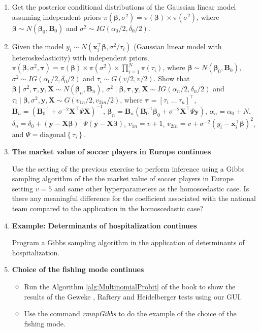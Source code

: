 \begin{enumerate}
	\item Get the posterior conditional distributions of the Gaussian linear model assuming independent priors $\pi(\bm{\beta},\sigma^2)=\pi(\bm{\beta})\times\pi(\sigma^2)$, where $\bm{\beta} \sim N(\bm{\beta}_0, {\bm{B}}_0)$ and $\sigma^2 \sim IG(\alpha_0/2, \delta_0/2)$.
	
	\item Given the model $y_i\sim N({\bm{x}}_i^{\top}\bm{\beta}, \sigma^2/\tau_i)$ (Gaussian linear model with heteroskedasticity) with independent priors,  $\pi(\bm{\beta},\sigma^2,\bm{\tau})=\pi(\bm{\beta})\times\pi(\sigma^2)\times\prod_{i=1}^N\pi(\tau_i)$, where $\bm{\beta} \sim N(\bm{\beta}_0, {\bm{B}}_0)$, $\sigma^2 \sim IG(\alpha_0/2, \delta_0/2)$ and $\tau_i\sim G(v/2,v/2)$. Show that $\bm{\beta}\mid \sigma^2,\bm{\tau},{\bm{y}},{\bm{X}}\sim N(\bm{\beta}_n,{\bm{B}}_n)$, $\sigma^2\mid \bm{\beta},\bm{\tau},{\bm{y}},{\bm{X}}\sim IG(\alpha_n/2,\delta_n/2)$ and $\tau_i\mid \bm{\beta},\sigma^2,{\bm{y}},{\bm{X}}\sim G(v_{1n}/2,v_{2in}/2)$, where $\bm{\tau}=[\tau_1 \ \dots \ \tau_n]^{\top}$, ${\bm{B}}_n=({\bm{B}}_0^{-1}+\sigma^{-2}{{\bm{X}}}^{\top}\Psi{{\bm{X}}})^{-1}$, $\bm{\beta}_n={\bm{B}}_n({\bm{B}}_0^{-1}\bm{\beta}_0+\sigma^{-2}{\bm{X}}^{\top}\Psi{\bm{y}})$, $\alpha_n=\alpha_0+N$, $\delta_n=\delta_0+({\bm{y}}-{\bm{X}}\bm{\beta})^{\top}\Psi({\bm{y}}-{\bm{X}}\bm{\beta})$, $v_{1n}=v+1$, $v_{2in}=v+\sigma^{-2}(y_i-{\bm{x}}_i^{\top}\bm{\beta})^2$, and $\Psi=\text{diagonal}\left\{\tau_i\right\}$.
		
	\item \textbf{The market value of soccer players in Europe continues}
	
	Use the setting of the previous exercise to perform inference using a Gibbs sampling algorithm of the the market value of soccer players in Europe setting $v=5$ and same other hyperparameters as the homoscedastic case. Is there any meaningful difference for the coefficient associated with the national team compared to the application in the homoscedastic case?
	
	\item \textbf{Example: Determinants of hospitalization continues}
	
	Program a Gibbs sampling algorithm in the application of determinants of hospitalization.
	
	\item \textbf{Choice of the fishing mode continues} 
	
	\begin{itemize}
		\item Run the Algorithm \ref{alg:MultinomialProbit} of the book to show the results of the Geweke \cite{Geweke1992}, Raftery \cite{Raftery1992} and Heidelberger \cite{Heidelberger1983} tests using our GUI.
		\item Use the command \textit{rmnpGibbs} to do the example of the choice of the fishing mode. 
	\end{itemize}
	

\end{enumerate}
